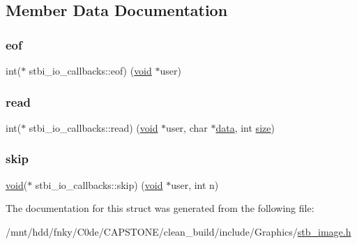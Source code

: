 \subsection{Member Data Documentation}
\mbox{\label{structstbi__io__callbacks_a319639db2f76e715eed7a7a974136832}} 
\subsubsection{\texorpdfstring{eof}{eof}}
{\footnotesize\ttfamily int($\ast$ stbi\+\_\+io\+\_\+callbacks\+::eof) (\hyperlink{imgui__impl__opengl3__loader_8h_ac668e7cffd9e2e9cfee428b9b2f34fa7}{void} $\ast$user)}

\mbox{\label{structstbi__io__callbacks_a623e46b3a2a019611601409926283a88}} 
\subsubsection{\texorpdfstring{read}{read}}
{\footnotesize\ttfamily int($\ast$ stbi\+\_\+io\+\_\+callbacks\+::read) (\hyperlink{imgui__impl__opengl3__loader_8h_ac668e7cffd9e2e9cfee428b9b2f34fa7}{void} $\ast$user, char $\ast$\hyperlink{imgui__impl__opengl3__loader_8h_abd87654504355b4c1bb002dcb1d4d16a}{data}, int \hyperlink{imgui__impl__opengl3__loader_8h_a3d1e3edfcf61ca2d831883e1afbad89e}{size})}

\mbox{\label{structstbi__io__callbacks_a257aac5480a90a6c4b8fbe86c1b01068}} 
\subsubsection{\texorpdfstring{skip}{skip}}
{\footnotesize\ttfamily \hyperlink{imgui__impl__opengl3__loader_8h_ac668e7cffd9e2e9cfee428b9b2f34fa7}{void}($\ast$ stbi\+\_\+io\+\_\+callbacks\+::skip) (\hyperlink{imgui__impl__opengl3__loader_8h_ac668e7cffd9e2e9cfee428b9b2f34fa7}{void} $\ast$user, int n)}



The documentation for this struct was generated from the following file\+:\begin{DoxyCompactItemize}
\item 
/mnt/hdd/fnky/\+C0de/\+C\+A\+P\+S\+T\+O\+N\+E/clean\+\_\+build/include/\+Graphics/\hyperlink{stb__image_8h}{stb\+\_\+image.\+h}\end{DoxyCompactItemize}
